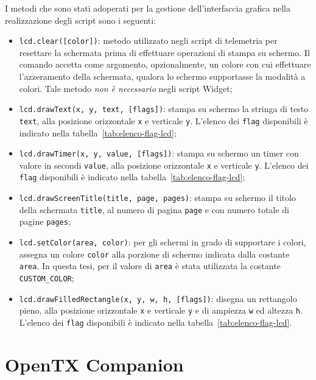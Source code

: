 \documentclass[a4paper, 12pt]{report}
\begin{document}
I metodi che sono stati adoperati per la gestione dell'interfaccia grafica nella realizzazione degli script sono i seguenti:
\begin{itemize}
        \item \texttt{lcd.clear([color])}: metodo utilizzato negli script di telemetria per resettare la schermata prima di effettuare operazioni di stampa su schermo. Il comando accetta come argomento, opzionalmente, un colore con cui effettuare l'azzeramento della schermata, qualora lo schermo supportasse la modalità a colori. Tale metodo \emph{non è necessario} negli script Widget;
        \item \texttt{lcd.drawText(x, y, text, [flags])}: stampa su schermo la stringa di testo \texttt{text}, alla posizione orizzontale \texttt{x} e verticale \texttt{y}. L'elenco dei \texttt{flag} disponibili è indicato nella tabella~\ref{tab:elenco-flag-lcd};
        \item \texttt{lcd.drawTimer(x, y, value, [flags])}: stampa su schermo un timer con valore in secondi \texttt{value}, alla posizione orizzontale \texttt{x} e verticale \texttt{y}. L'elenco dei \texttt{flag} disponibili è indicato nella tabella~\ref{tab:elenco-flag-lcd};
        \item \texttt{lcd.drawScreenTitle(title, page, pages)}: stampa su schermo il titolo della schermata \texttt{title}, al numero di pagina \texttt{page} e con numero totale di pagine \texttt{pages};
        \item \texttt{lcd.setColor(area, color)}: per gli schermi in grado di supportare i colori, assegna un colore \texttt{color} alla porzione di schermo indicata dalla costante \texttt{area}. In questa tesi, per il valore di \texttt{area} è stata utilizzata la costante \texttt{CUSTOM\_COLOR};
        \item \texttt{lcd.drawFilledRectangle(x, y, w, h, [flags])}: disegna un rettangolo pieno, alla posizione orizzontale \texttt{x} e verticale \texttt{y} e di ampiezza \texttt{w} ed altezza \texttt{h}. L'elenco dei \texttt{flag} disponibili è indicato nella tabella~\ref{tab:elenco-flag-lcd}.
\end{itemize}










\section{OpenTX Companion}
\end{document}
